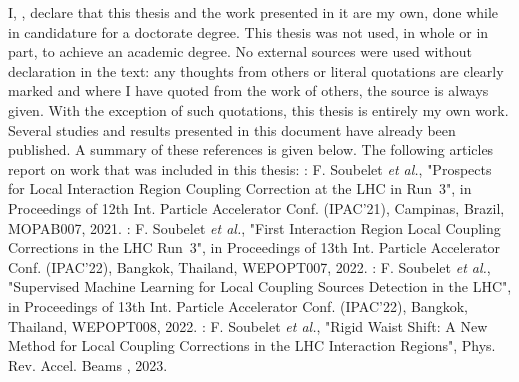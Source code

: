\begin{declaration}
\addchaptertocentry{\authorshipname} %

\vspace{1cm}

I, \authorname, declare that this thesis and the work presented in it are my own, done while in candidature for a doctorate degree.
This thesis was not used, in whole or in part, to achieve an academic degree.
No external sources were used without declaration in the text: any thoughts from others or literal quotations are clearly marked and where I have quoted from the work of others, the source is always given.
With the exception of such quotations, this thesis is entirely my own work.\\

Several studies and results presented in this document have already been published.
A summary of these references is given below.
The following articles report on work that was included in this thesis:
\newline \newline
\noindent\cite{IPAC:Soubelet:Prospect_IR_Coupling_Correction_LHC_Run3}: F. Soubelet \textit{et al.}, "Prospects for Local Interaction Region Coupling Correction at the LHC in Run~\num{3}", in Proceedings of \num{12}th Int. Particle Accelerator Conf. (IPAC'21), Campinas, Brazil, MOPAB007, \num{2021}.
\newline \newline
\noindent\cite{IPAC:Soubelet:First_Corrections_IR_Local_Coupling_LHC_Run3}: F. Soubelet \textit{et al.}, "First Interaction Region Local Coupling Corrections in the LHC Run~\num{3}", in Proceedings of \num{13}th Int. Particle Accelerator Conf. (IPAC'22), Bangkok, Thailand, WEPOPT007, \num{2022}.
\newline \newline
\noindent\cite{IPAC:Soubelet:Supervised_Machine_Learning_Local_Coupling_Sources_Detection_LHC}: F. Soubelet \textit{et al.}, "Supervised Machine Learning for Local Coupling Sources Detection in the LHC", in Proceedings of \num{13}th Int. Particle Accelerator Conf. (IPAC'22), Bangkok, Thailand, WEPOPT008, \num{2022}.
\newline \newline
\noindent{}: F. Soubelet \textit{et al.}, "Rigid Waist Shift: A New Method for Local Coupling Corrections in the LHC Interaction Regions", Phys. Rev. Accel. Beams , \num{2023}.
\newline \newline

\end{declaration}
